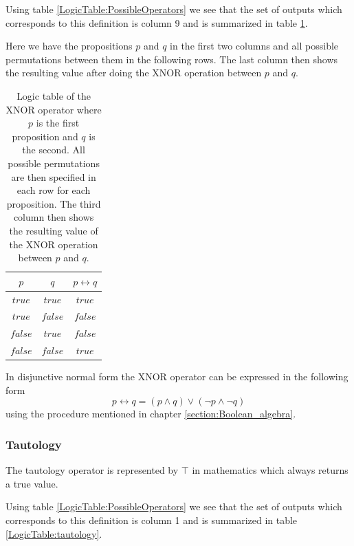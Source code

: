         Using table \ref{LogicTable:PossibleOperators} we see that the set of outputs which corresponds to this definition is column 9 and is summarized in table \ref{LogicTable:XNOR}.
        
        Here we have the propositions $p$ and $q$ in the first two columns and all possible permutations between them in the following rows. The last column then shows the resulting value after doing the XNOR operation between $p$ and $q$.
        
        \begin{table}[h!]
            \centering
            \begin{tabular}{|c|c|c|}
            	\hline
            	  $p$   &   $q$   & $p \leftrightarrow q$ \\ \hline
            	$true$  & $true$  &        $true$         \\ \hline
            	$true$  & $false$ &        $false$        \\ \hline
            	$false$ & $true$  &        $false$        \\ \hline
            	$false$ & $false$ &        $true$         \\ \hline
            \end{tabular}
            \caption{Logic table of the XNOR operator where $p$ is the first proposition and $q$ is the second. All possible permutations are then specified in each row for each proposition. The third column then shows the resulting value of the XNOR operation between $p$ and $q$.}
            \label{LogicTable:XNOR}
        \end{table}
        
        In disjunctive normal form the XNOR operator can be expressed in the following form
        \begin{equation}
            p \leftrightarrow q = (p \wedge  q) \vee (\neg p \wedge \neg q)
        \end{equation}
        using the procedure mentioned in chapter \ref{section:Boolean_algebra}.


    \subsubsection{Tautology}
        The tautology operator is represented by $\top$ in mathematics which always returns a true value.
        
        Using table \ref{LogicTable:PossibleOperators} we see that the set of outputs which corresponds to this definition is column 1 and is summarized in table \ref{LogicTable:tautology}.
        
